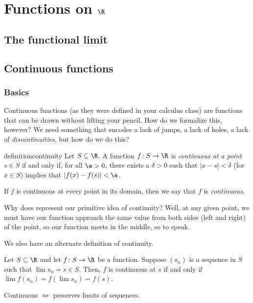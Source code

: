 \documentclass[class=article, crop=false]{standalone}
\begin{document}
\section{Functions on $\R$}

\subsection{The functional limit}



\subsection{Continuous functions}

\subsubsection*{Basics}

Continuous functions (as they were defined in your calculus class) are functions that can be drawn without lifting your pencil. How do we formalize this, however? We need something that encodes a lack of jumps, a lack of holes, a lack of \textit{discontinuities}, but how do we do this?

\begin{tcolorbox}[colback=definitionBackground, colframe=definitionBackground, sharp corners, before upper={\parindent24pt}]
    \begin{restatable}[Continuity]{definition}{continuity}
        Let $S \subseteq \R$. A function $f \colon S \to \R$ is \textit{continuous at a point} $s \in S$ if and only if, for all $\e > 0$, there exists a $\delta > 0$ such that $|x-s| <\delta$ (for $x \in S$) implies that $|f(x)-f(s)| < \e$.

        If $f$ is continuous at every point in its domain, then we say that $f$ is \textit{continuous}.
    \end{restatable}
\end{tcolorbox}

Why does represent our primitive idea of continuity? Well, at any given point, we must have our function approach the same value from both sides (left and right) of the point, so our function meets in the middle, so to speak.

We also have an alternate definition of continuity.
\begin{thm}{\label{thm:sequential def of cont}}
    Let $S \subseteq \R$ and let $f \colon S \to \R$ be a function. Suppose $(s_n)$ is a sequence in $S$ such that $\lim s_n = s \in S$. Then, $f$ is continuous at $s$ if and only if $\lim f(s_n) = f(\lim s_n) = f(s)$.
\end{thm}
\begin{slogan}
    Continuous $\iff$ preserves limits of sequences.
\end{slogan}
\end{document}
